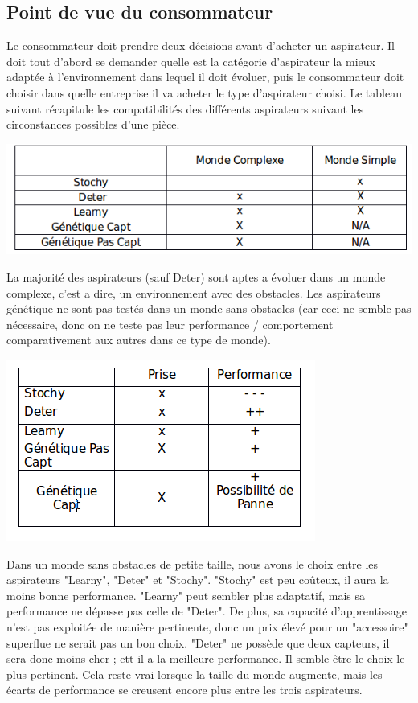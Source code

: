 \documentclass[12pt]{article}
\begin{document}
\subsection{Point de vue du consommateur}
\justify
Le consommateur doit prendre deux décisions avant d'acheter un aspirateur. Il doit tout d'abord se demander quelle est la catégorie d'aspirateur la mieux adaptée à l'environnement dans lequel il doit évoluer, puis le consommateur doit choisir dans quelle entreprise il va acheter le type d'aspirateur choisi.
\justify
Le tableau suivant récapitule les compatibilités des différents aspirateurs suivant les circonstances possibles d'une pièce. 
\begin{center}
	\includegraphics[scale=0.5]{2}
\end{center}
La majorité des aspirateurs (sauf Deter) sont aptes a évoluer dans un monde complexe, c'est a dire, un environnement avec des obstacles. Les aspirateurs génétique ne sont pas testés dans un monde sans obstacles (car ceci ne semble pas nécessaire, donc on ne teste pas leur performance / comportement comparativement aux autres dans ce type de monde). 
\begin{center}
	\includegraphics[scale=0.5]{3}
\end{center}
\justify
Dans un monde sans obstacles de petite taille, nous avons le choix entre les aspirateurs "Learny", "Deter" et "Stochy".
"Stochy" est peu coûteux, il aura la moins bonne performance. "Learny" peut sembler plus adaptatif, mais sa performance ne dépasse pas celle de "Deter". De plus, sa capacité d'apprentissage n'est pas exploitée de manière pertinente, donc un prix élevé pour un "accessoire" superflue ne serait pas un bon choix. "Deter" ne possède que deux capteurs, il sera donc moins cher ; ett il a la meilleure performance. Il semble être le choix le plus pertinent. Cela reste vrai lorsque la taille du monde augmente, mais les écarts de performance se creusent encore plus entre les trois aspirateurs.
\end{document}
